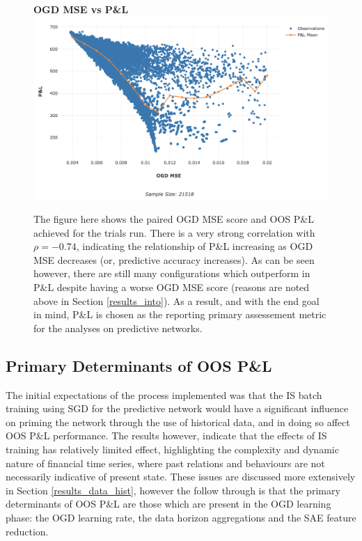 \documentclass[a4paper,11pt,oneside]{article}
\theoremstyle{plain}
\theoremstyle{definition}
\begin{document}
		\begin{figure}[H]
		\textbf{OGD MSE vs P\&L}
		\centering
		\includegraphics[scale=0.45]{images/results/intro/ogdmse_pl.png}
		\caption[OGD MSE vs OOS P\&L]
		{The figure here shows the paired OGD MSE score and OOS P\&L achieved for the trials run. There is a very strong correlation with $\rho = -0.74$, indicating the relationship of P\&L increasing as OGD MSE decreases (or, predictive accuracy increases). As can be seen however, there are still many configurations which outperform in P\&L despite having a worse OGD MSE score (reasons are noted above in Section \ref{results_into}). As a result, and with the end goal in mind, P\&L is chosen as the reporting primary assessement metric for the analyses on predictive networks. }
		\label{figure-ogdmse_pl}
	\end{figure}
	
	\newpage
	\subsection{Primary Determinants of OOS P\&L}\label{results_oos_pl}
	
	The initial expectations of the process implemented was that the IS batch training using SGD for the predictive network would have a significant influence on priming the network through the use of historical data, and in doing so affect OOS P\&L performance. The results however, indicate that the effects of IS training has relatively limited effect, highlighting the complexity and dynamic nature of financial time series, where past relations and behaviours are not necessarily indicative of present state. These issues are discussed more extensively in Section \ref{results_data_hist}, however the follow through is that the primary determinants of OOS P\&L are those which are present in the OGD learning phase: the OGD learning rate, the data horizon aggregations and the SAE feature reduction.\newline
	
\end{document}
